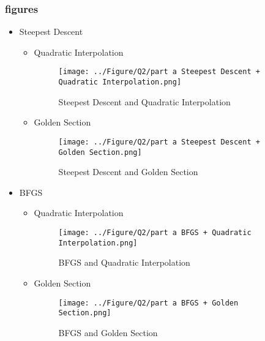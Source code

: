 \subsubsection{figures}
\newpage
\begin{itemize}
	\item Steepest Descent
	\begin{itemize}
		\item Quadratic Interpolation
		\begin{figure}[H]
			\caption{Steepest Descent and Quadratic Interpolation}
			\centering
			\texttt{[image: ../Figure/Q2/part a Steepest Descent + Quadratic Interpolation.png]}
		\end{figure}
		\item Golden Section
		\begin{figure}[H]
			\caption{Steepest Descent and Golden Section}
			\centering
			\texttt{[image: ../Figure/Q2/part a Steepest Descent + Golden Section.png]}
		\end{figure}
	\end{itemize}
	\item BFGS
	\begin{itemize}
		\item Quadratic Interpolation
		\begin{figure}[H]
			\caption{BFGS and Quadratic Interpolation}
			\centering
			\texttt{[image: ../Figure/Q2/part a BFGS + Quadratic Interpolation.png]}
		\end{figure}
		\item Golden Section
		\begin{figure}[H]
			\caption{BFGS and Golden Section}
			\centering
			\texttt{[image: ../Figure/Q2/part a BFGS + Golden Section.png]}
		\end{figure}
	\end{itemize}
\end{itemize}
